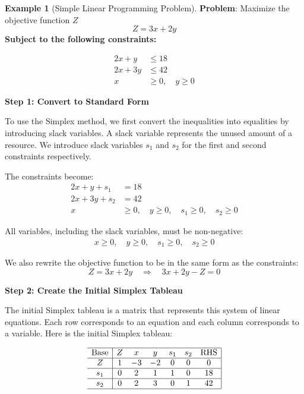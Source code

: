 \documentclass[11pt,a4paper]{article}
\theoremstyle{definition}
\newtheorem{example}{Example}[section]
\theoremstyle{plain}
\theoremstyle{remark}
\begin{document}
\begin{example}[Simple Linear Programming Problem]
    \textbf{Problem}: Maximize the objective function $Z$
    \[
        Z = 3x + 2y
    \]
    \textbf{Subject to the following constraints:}
    
    \begin{align*}
        2x + y &\leq 18 \\
        2x + 3y &\leq 42 \\
        x &\geq 0,\quad y \geq 0
    \end{align*}

    \textbf{Step 1: Convert to Standard Form}
    
    To use the Simplex method, we first convert the inequalities into equalities by introducing slack variables. A slack variable represents the unused amount of a resource. We introduce slack variables $s_1$ and $s_2$ for the first and second constraints respectively.

    The constraints become:
    \begin{align*}
        2x + y + s_1 &= 18 \\
        2x + 3y + s_2 &= 42 \\
        x &\geq 0,\quad y \geq 0,\quad s_1 \geq 0,\quad s_2 \geq 0
    \end{align*}
    
    All variables, including the slack variables, must be non-negative:
    \begin{align*}
        x \geq 0, \quad y \geq 0, \quad s_1 \geq 0, \quad s_2 \geq 0
    \end{align*}
    
    We also rewrite the objective function to be in the same form as the constraints:
    \[
        Z = 3x + 2y \quad \Rightarrow \quad 3x + 2y - Z = 0
    \]
    
    \textbf{Step 2: Create the Initial Simplex Tableau}
    
    The initial Simplex tableau is a matrix that represents this system of linear equations. Each row corresponds to an equation and each column corresponds to a variable. Here is the initial Simplex tableau:
    
    \[ 
        \begin{array}{c|cccccc|c}
            \hline
            \text{Base} & Z & x & y & s_1 & s_2 & \text{RHS} \\
            \hline
            Z & 1 & -3 & -2 & 0 & 0 & 0 \\
            \hline
            s_1 & 0 & 2 & 1 & 1 & 0 & 18 \\
            \hline
            s_2 & 0 & 2 & 3 & 0 & 1 & 42 \\
            \hline
        \end{array}
    \]


\end{example}
\end{document}
